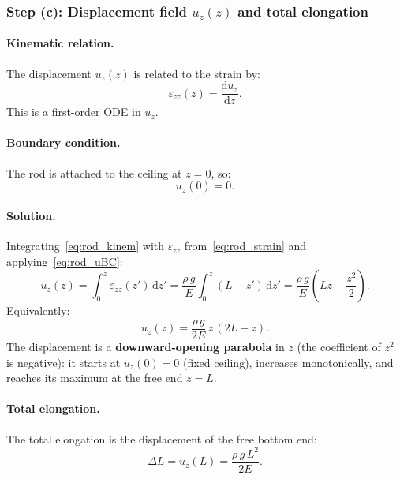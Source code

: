 \subsubsection*{Step (c): Displacement field $u_z(z)$ and total elongation}

\paragraph{Kinematic relation.}
The displacement $u_z(z)$ is related to the strain by:
\begin{equation}
    \varepsilon_{zz}(z) = \frac{\mathrm{d}u_z}{\mathrm{d}z}.
    \label{eq:rod_kinem}
\end{equation}
This is a first-order ODE in $u_z$.

\paragraph{Boundary condition.}
The rod is attached to the ceiling at $z=0$, so:
\begin{equation}
    u_z(0) = 0.
    \label{eq:rod_uBC}
\end{equation}

\paragraph{Solution.}
Integrating~\eqref{eq:rod_kinem} with $\varepsilon_{zz}$ from~\eqref{eq:rod_strain} and applying~\eqref{eq:rod_uBC}:
\begin{equation}
    u_z(z) = \int_0^z \varepsilon_{zz}(z')\,\mathrm{d}z'
            = \frac{\rho\, g}{E}\int_0^z (L-z')\,\mathrm{d}z'
            = \frac{\rho\, g}{E}\!\left(Lz - \frac{z^2}{2}\right).
    \label{eq:rod_disp}
\end{equation}
Equivalently:
\begin{equation}
    u_z(z) = \frac{\rho\, g}{2E}\,z\,(2L - z).
    \label{eq:rod_disp2}
\end{equation}
The displacement is a \textbf{downward-opening parabola} in $z$ (the coefficient of $z^2$ is negative): it starts at $u_z(0)=0$ (fixed ceiling), increases monotonically, and reaches its maximum at the free end $z=L$.

\paragraph{Total elongation.}
The total elongation is the displacement of the free bottom end:
\begin{equation}
    \boxed{\Delta L = u_z(L) = \frac{\rho\, g\, L^2}{2E}.}
    \label{eq:rod_elongation}
\end{equation}

